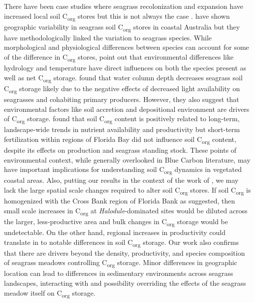 There have been case studies where seagrass recolonization and expansion have increased local soil C\textsubscript{org} stores \citep{Greiner:2013wi, Marba:2015hj} but this is not always the case \citep{Pedersen:1997fo}. \citet{Lavery:2013kh} have shown geographic variability in seagrass soil C\textsubscript{org} stores in coastal Australia but they have methodologically linked the variation to seagrass species. While morphological and physiological differences between species can account for some of the difference in C\textsubscript{org} stores, \citet{Lavery:2013kh} point out that environmental differences like hydrology and temperature have direct influences on both the species present as well as net C\textsubscript{org} storage. \citet{Serrano:2014ho} found that water column depth decreases seagrass soil C\textsubscript{org} storage likely due to the negative effects of decreased light availability on seagrasses and cohabiting primary producers. However, they also suggest that environmental factors like soil accretion and depositional environment are drivers of C\textsubscript{org} storage. \citet{Armitage:2016ek} found that soil C\textsubscript{org} content is positively related to long-term, landscape-wide trends in nutrient availability and productivity but short-term fertilization within regions of Florida Bay did not influence soil C\textsubscript{org} content, despite its effects on production and seagrass standing stock. These points of environmental context, while generally overlooked in Blue Carbon literature, may have important implications for understanding soil C\textsubscript{org} dynamics in vegetated coastal areas. Also, putting our results in the context of the work of \citet{Armitage:2016ek}, we may lack the large spatial scale changes required to alter soil C\textsubscript{org} stores. If soil C\textsubscript{org} is homogenized with the Cross Bank region of Florida Bank as suggested, then small scale increases in C\textsubscript{org} at \textit{Halodule}-dominated sites would be diluted across the larger, less-productive area and bulk changes in C\textsubscript{org} storage would be undetectable. On the other hand, regional increases in productivity could translate in to notable differences in soil C\textsubscript{org} storage. Our work also confirms that there are drivers beyond the density, productivity, and species composition of seagrass meadows controlling C\textsubscript{org} storage. Minor differences in geographic location can lead to differences in sedimentary environments across seagrass landscapes, interacting with and possibility overriding the effects of the seagrass meadow itself on C\textsubscript{org} storage.

